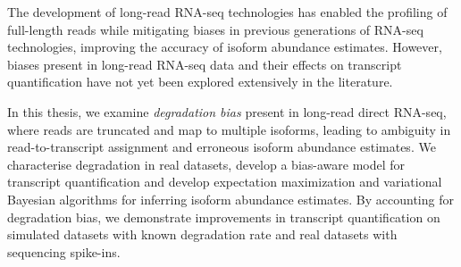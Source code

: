 
The development of long-read RNA-seq technologies has enabled the profiling of full-length reads while mitigating biases in previous generations of RNA-seq technologies, improving the accuracy of isoform abundance estimates. However, biases present in long-read RNA-seq data and their effects on transcript quantification have not yet been explored extensively in the literature. 

In this thesis, we examine \textit{degradation bias} present in long-read direct RNA-seq, where reads are truncated and map to multiple isoforms, leading to ambiguity in read-to-transcript assignment and erroneous isoform abundance estimates. We characterise degradation in real datasets, develop a bias-aware model for transcript quantification and develop expectation maximization and variational Bayesian algorithms for inferring isoform abundance estimates. By accounting for degradation bias, we demonstrate improvements in transcript quantification on simulated datasets with known degradation rate and real datasets with sequencing spike-ins.

